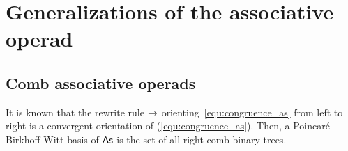 \section{Generalizations of the associative operad} \label{sec:CAs_d}

\subsection{Comb associative operads}

It is known that the rewrite rule $\operatorname{\to}$
orienting~\eqref{equ:congruence_as} from left to right is a convergent
orientation of (\ref{equ:congruence_as}). Then, a Poincaré-Birkhoff-Witt
basis of $\mathsf{As}$ is the set of all right comb binary trees.
\medbreak


